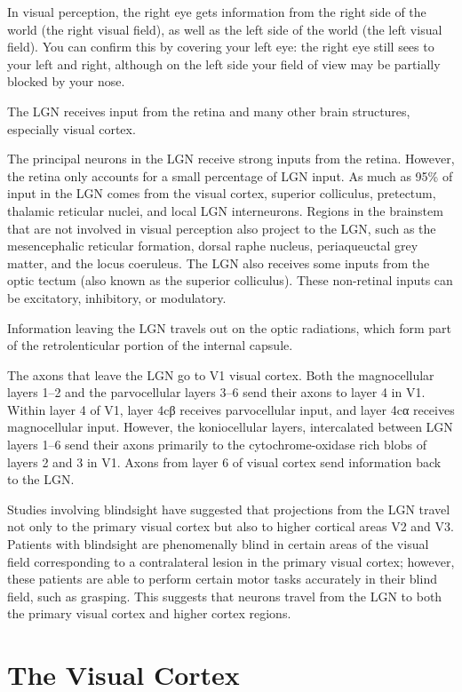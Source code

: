 \documentclass[]{book}
\begin{document}
In visual perception, the right eye gets information from the right side of the world (the right visual field), as well as the left side of the world (the left visual field). You can confirm this by covering your left eye: the right eye still sees to your left and right, although on the left side your field of view may be partially blocked by your nose.

The LGN receives input from the retina and many other brain structures, especially visual cortex.

The principal neurons in the LGN receive strong inputs from the retina. However, the retina only accounts for a small percentage of LGN input. As much as 95\% of input in the LGN comes from the visual cortex, superior colliculus, pretectum, thalamic reticular nuclei, and local LGN interneurons. Regions in the brainstem that are not involved in visual perception also project to the LGN, such as the mesencephalic reticular formation, dorsal raphe nucleus, periaqueuctal grey matter, and the locus coeruleus. The LGN also receives some inputs from the optic tectum (also known as the superior colliculus). These non-retinal inputs can be excitatory, inhibitory, or modulatory.

Information leaving the LGN travels out on the optic radiations, which form part of the retrolenticular portion of the internal capsule.

The axons that leave the LGN go to V1 visual cortex. Both the magnocellular layers 1--2 and the parvocellular layers 3--6 send their axons to layer 4 in V1. Within layer 4 of V1, layer 4cβ receives parvocellular input, and layer 4cα receives magnocellular input. However, the koniocellular layers, intercalated between LGN layers 1--6 send their axons primarily to the cytochrome-oxidase rich blobs of layers 2 and 3 in V1. Axons from layer 6 of visual cortex send information back to the LGN.

Studies involving blindsight have suggested that projections from the LGN travel not only to the primary visual cortex but also to higher cortical areas V2 and V3. Patients with blindsight are phenomenally blind in certain areas of the visual field corresponding to a contralateral lesion in the primary visual cortex; however, these patients are able to perform certain motor tasks accurately in their blind field, such as grasping. This suggests that neurons travel from the LGN to both the primary visual cortex and higher cortex regions.

\hypertarget{the-visual-cortex}{%
\section{The Visual Cortex}\label{the-visual-cortex}}
\end{document}
